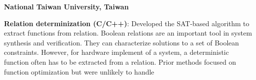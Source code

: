 \begin{myexp}
\begin{myexp}
\end{myexp}
\item \textbf{National Taiwan University, Taiwan}   
    \begin{myexp}
    \item {\bf Relation determinization (C/C++)}: 
        Developed the SAT-based algorithm to extract functions
        from relation. Boolean relations are an important tool in system
        synthesis and verification. They can characterize solutions to a set of
        Boolean constraints. However, for hardware implement of a system, a
        deterministic function often has to be extracted from a relation. Prior
        methods focused on function optimization but were unlikely to handle

\end{myexp}
\end{myexp}
